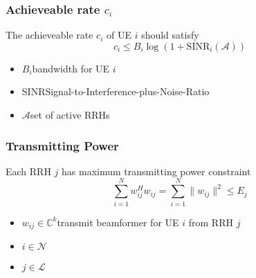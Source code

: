 \documentclass[usenames,dvipsnames]{beamer}
\begin{document}
\begin{frame}
  \frametitle{Achieveable rate $c_{i}$}
  \begin{exampleblock}{The achieveable rate $c_{i}$ of UE $i$ should satisfy}
    \[
      c_{i} \leq B_{i}\log(1+\text{SINR}_{i}(\mathcal{A})) 
    \] 
  \end{exampleblock}
  \begin{itemize}
    \item $B_{i}$\qquad bandwidth for UE $i$\\
    \item SINR\quad Signal-to-Interference-plus-Noise-Ratio\\
    \item $\mathcal{A}$\qquad set of active RRHs
  \end{itemize}
\end{frame}
\begin{frame}
  \frametitle{Transmitting Power}
  \begin{exampleblock}{Each RRH $j$ has maximum transmitting power constraint}
    \[
      \sum_{i = 1}^{N}w_{ij}^{H}w_{ij}  = \sum_{i = 1}^{N} \lVert w_{ij}\rVert^2 \leq E_{j}
    \]
  \end{exampleblock}
  \begin{itemize}
    \item $w_{ij}\in\mathbb{C}^{k}$\quad transmit beamformer for UE $i$ from RRH $j$
    \item $i\in\mathcal{N}$
    \item $j\in\mathcal{L}$
  \end{itemize}
\end{frame}
\end{document}

